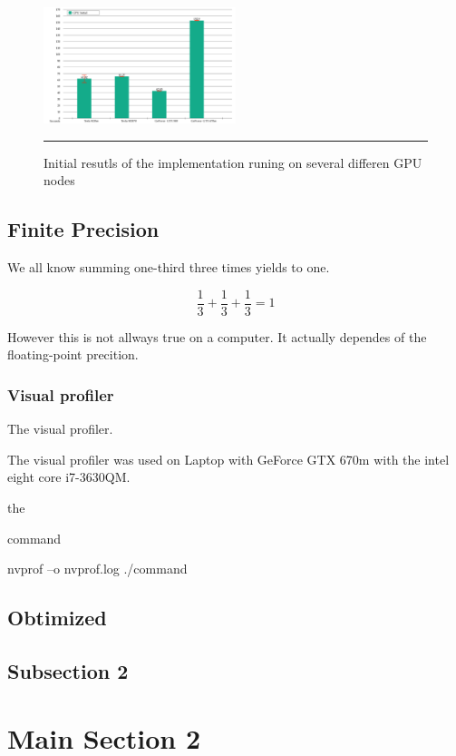 \begin{figure}[htbp]
	\centering
		\includegraphics[width=0.5\textwidth]{Figures/initial_results.png}
		\rule{35em}{0.2pt}
	\caption[Initial GPU results]{Initial resutls of the implementation runing on several differen GPU nodes}
	\label{fig:iniresults}
\end{figure}


\subsection{Finite Precision}

We all know summing one-third three times yields to one.

$$\dfrac{1}{3} + \dfrac{1}{3} + \dfrac{1}{3} = 1$$

 However this is not allways true on a computer. It actually dependes of the floating-point precition. 


\subsubsection{Visual profiler}

The visual profiler.

The visual profiler was used on Laptop with GeForce GTX 670m with the intel eight core i7-3630QM.


the

command

 nvprof –o nvprof.log ./command


\subsection{Obtimized}



\subsection{Subsection 2}


\section{Main Section 2}
